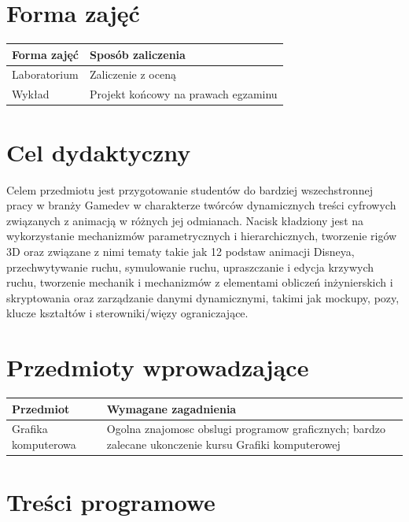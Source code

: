 \documentclass[12pt, a4paper]{article}
\begin{document}
\section{Forma zajęć}

\begin{tabular}{ll}
  \hline
  \textbf{Forma zajęć} & \textbf{Sposób zaliczenia} \\
  \hline
  Laboratorium & Zaliczenie z oceną \\
  Wykład & Projekt końcowy na prawach egzaminu \\
  \hline
\end{tabular}

\section{Cel dydaktyczny}

Celem przedmiotu jest przygotowanie studentów do bardziej wszechstronnej pracy w branży Gamedev w charakterze twórców dynamicznych treści cyfrowych związanych z animacją w różnych jej odmianach. Nacisk kładziony jest na wykorzystanie mechanizmów parametrycznych i hierarchicznych, tworzenie rigów 3D oraz związane z nimi tematy takie jak 12 podstaw animacji Disneya, przechwytywanie ruchu, symulowanie ruchu, upraszczanie i edycja krzywych ruchu, tworzenie mechanik i mechanizmów z elementami obliczeń inżynierskich i skryptowania oraz zarządzanie danymi dynamicznymi, takimi jak mockupy, pozy, klucze kształtów i sterowniki/więzy ograniczające.

\section{Przedmioty wprowadzające}

\begin{tabularx}{\textwidth}{lX}
  \hline
  \textbf{Przedmiot} & \textbf{Wymagane zagadnienia} \\
  \hline
  Grafika komputerowa & Ogolna znajomosc obslugi programow graficznych; bardzo zalecane ukonczenie kursu Grafiki komputerowej \\
  \hline
\end{tabularx}

\section{Treści programowe}
\end{document}
